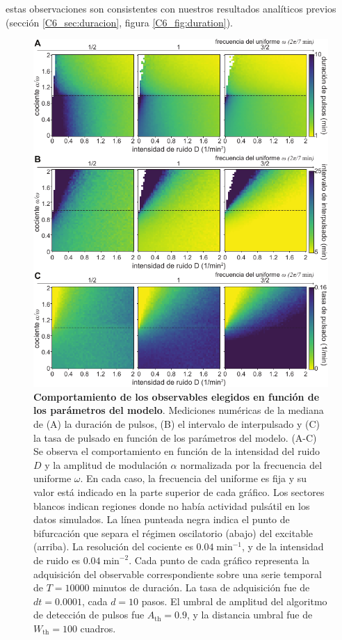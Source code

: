 \documentclass[./main.tex]{subfiles}
\begin{document}
estas observaciones son consistentes con nuestros resultados analíticos previos (sección \ref{C6_sec:duracion}, figura \ref{C6_fig:duration}).

 \begin{figure}
    \centering 
    \includegraphics[width=1\columnwidth]{figures/chapter6/C6_2d_plots.pdf} 
    \caption{\textbf{Comportamiento de los observables elegidos en función de los parámetros del modelo}. Mediciones numéricas de la mediana de (A) la duración de pulsos, (B) el intervalo de interpulsado y (C) la tasa de pulsado en función de los parámetros del modelo. (A-C) Se observa el comportamiento en función de la intensidad del ruido $D$  y la amplitud de modulación $\alpha$ normalizada por la frecuencia del uniforme $\omega$. En cada caso, la frecuencia del uniforme es fija y su valor está indicado en la parte superior de cada gráfico. Los sectores blancos indican regiones donde no había actividad pulsátil en los datos simulados. La línea punteada negra indica el punto de bifurcación que separa el régimen oscilatorio (abajo) del excitable (arriba). La resolución del cociente \dddelta es $0.04\; \text{min}^{-1}$, y de la intensidad de ruido es $0.04\; \text{min}^{-2}$. Cada punto de cada gráfico representa la adquisición del observable correspondiente sobre una serie temporal de $T = 10000$ minutos de duración. La tasa de adquisición fue de $dt = 0.0001$, cada $d = 10$ pasos. El umbral de amplitud del algoritmo de detección de pulsos fue $A_{\text{th}} = 0.9$, y la distancia umbral fue de $W_{\text{th}} = 100 $ cuadros.}
    \label{C6_fig:2d_plots}
\end{figure}
\end{document}
